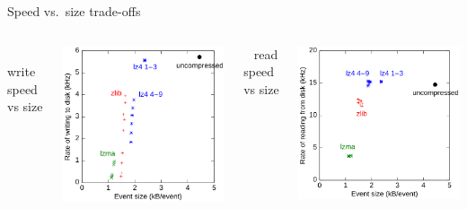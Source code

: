 \documentclass[aspectratio=169]{beamer}
\begin{document}
\begin{frame}{Speed vs.\ size trade-offs}
\vspace{0.5 cm}
\begin{columns}
\mbox{ } \hfill write speed vs size \hfill \mbox{ }

\includegraphics[width=\linewidth]{write.png}

\vspace{2 cm}

\mbox{ } \hfill read speed vs size \hfill \mbox{ }

\includegraphics[width=\linewidth]{read.png}


\end{columns}
\end{frame}
\end{document}
